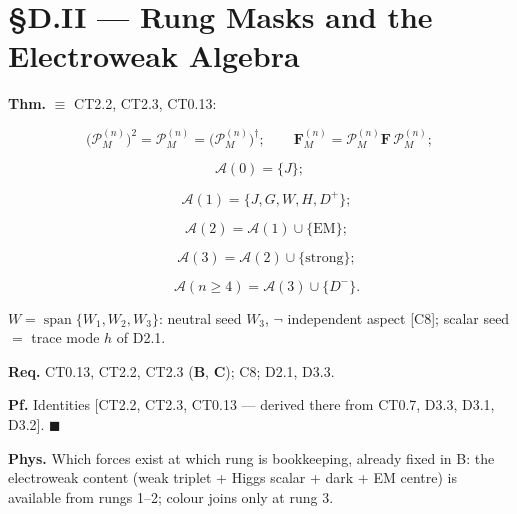 \section[§D.II — Rung Masks and the Electroweak Algebra]{\texorpdfstring{§D.II — Rung Masks and the Electroweak Algebra}{SD.II - Rung Masks and the Electroweak Algebra}}

\begin{theorem}\label{tag:EW-6}
\textbf{Thm.} $\equiv$ CT2.2, CT2.3, CT0.13:

\[
\bigl(\mathcal P_M^{(n)}\bigr)^2=\mathcal P_M^{(n)}=\bigl(\mathcal P_M^{(n)}\bigr)^\dagger;\qquad
\mathbf F_M^{(n)}=\mathcal P_M^{(n)}\mathbf F\,\mathcal P_M^{(n)};
\]

\[
\mathcal A(0)=\{J\};
\]

\[
\quad \mathcal A(1)=\{J,G,W,H,D^+\};
\]

\[
\quad \mathcal A(2)=\mathcal A(1)\cup\{\mathrm{EM}\};
\]

\[
\quad \mathcal A(3)=\mathcal A(2)\cup\{\mathrm{strong}\};
\]

\[
\quad \mathcal A(n\ge4)=\mathcal A(3)\cup\{D^-\}.
\]

$W=\operatorname{span}\{W_1,W_2,W_3\}$: neutral seed $W_3$, $\neg$ independent aspect [C8]; scalar seed $=$ trace mode $h$ of D2.1.

\textbf{Req.} CT0.13, CT2.2, CT2.3 (\textbf{B}, \textbf{C}); C8; D2.1, D3.3.

\textbf{Pf.} Identities [CT2.2, CT2.3, CT0.13 — derived there from CT0.7, D3.3, D3.1, D3.2]. $\blacksquare$

\textbf{Phys.} Which forces exist at which rung is bookkeeping, already fixed in B: the electroweak content (weak triplet + Higgs scalar + dark + EM centre) is available from rungs 1–2; colour joins only at rung 3.

\end{theorem}

